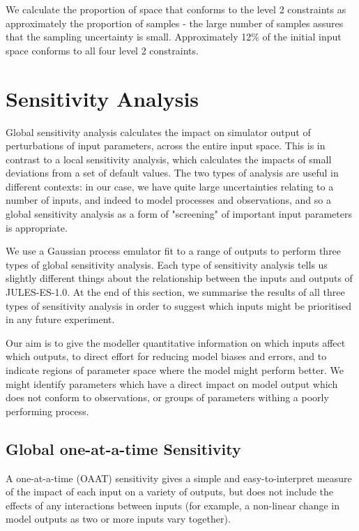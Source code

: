 \documentclass[gmd, manuscript]{copernicus}
\begin{document}
We calculate the proportion of space that conforms to the level 2 constraints as approximately the proportion of samples - the large number of samples assures that the sampling uncertainty is small. Approximately 12\% of the initial input space conforms to all four level 2 constraints.

\section{Sensitivity Analysis}\label{sec:sensitivity_analysis}

Global sensitivity analysis calculates the impact on simulator output of perturbations of input parameters, across the entire input space. This is in contrast to a local sensitivity analysis, which calculates the impacts of small deviations from a set of default values. The two types of analysis are useful in different contexts: in our case, we have quite large uncertainties relating to a number of inputs, and indeed to model processes and observations, and so a global sensitivity analysis as a form of "screening" of important input parameters is appropriate.

We use a Gaussian process emulator fit to a range of outputs to perform three types of global sensitivity analysis. Each type of sensitivity analysis tells us slightly different things about the relationship between the inputs and outputs of JULES-ES-1.0. At the end of this section, we summarise the results of all three types of sensitivity analysis in order to suggest which inputs might be prioritised in any future experiment.

Our aim is to give the modeller quantitative information on which inputs affect which outputs, to direct effort for reducing model biases and errors, and to indicate regions of parameter space where the model might perform better. We might identify parameters which have a direct impact on model output which does not conform to observations, or groups of parameters withing a poorly performing process.

\subsection{Global one-at-a-time Sensitivity}\label{ssec:sa_oaat}

A one-at-a-time (OAAT) sensitivity gives a simple and easy-to-interpret measure of the impact of each input on a variety of outputs, but does not include the effects of any interactions between inputs (for example, a non-linear change in model outputs as two or more inputs vary together).  
\end{document}
